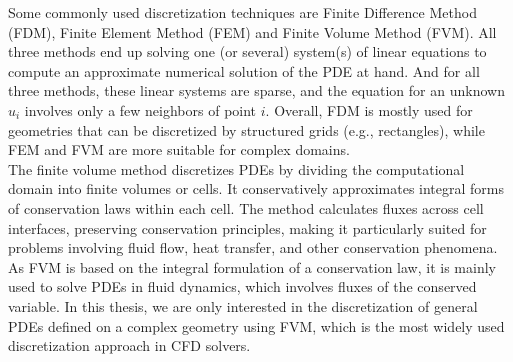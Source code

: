 Some commonly used discretization techniques are Finite Difference Method (FDM), Finite Element Method (FEM) and Finite Volume Method (FVM). All three methods end up solving one (or several) system(s) of linear equations to compute an approximate numerical solution of the PDE at hand. And for all three methods, these linear systems are sparse, and the equation for an unknown $u_i$ involves only a few neighbors of point $i$. Overall, FDM is mostly used for geometries that can be discretized by structured grids (e.g., rectangles), while FEM and FVM are more suitable for complex domains. \\
The finite volume method discretizes PDEs by dividing the computational domain into finite volumes or cells. It conservatively approximates integral forms of conservation laws within each cell. The method calculates fluxes across cell interfaces, preserving conservation principles, making it particularly suited for problems involving fluid flow, heat transfer, and other conservation phenomena. As FVM is based on the integral formulation of a conservation law, it is mainly used to solve PDEs in fluid dynamics, which involves fluxes of the conserved variable. In this thesis, we are only interested in the discretization of general PDEs defined on a complex geometry using FVM, which is the most widely used discretization approach in CFD solvers. 
